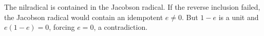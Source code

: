 The nilradical is contained in the Jacobson radical. If the reverse inclusion failed, the Jacobson radical would contain an idempotent $e\ne0$. But $1-e$ is a unit and $e(1-e)=0$, forcing $e=0$, a contradiction.
